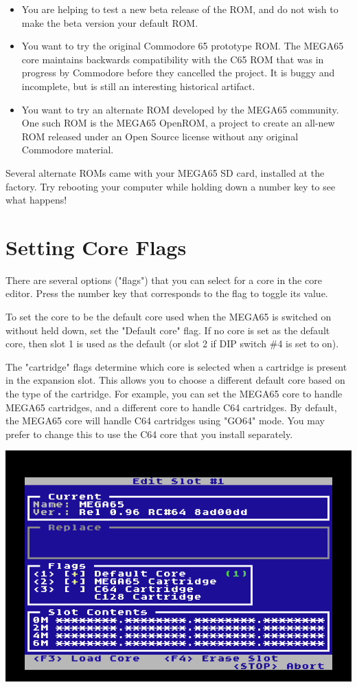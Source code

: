 \begin{itemize}
  \item You are helping to test a new beta release of the ROM, and do not wish to make the beta version your default ROM.
  \item You want to try the original Commodore 65 prototype ROM. The MEGA65 core maintains backwards compatibility with the C65 ROM that was in progress by Commodore before they cancelled the project. It is buggy and incomplete, but is still an interesting historical artifact.
  \item You want to try an alternate ROM developed by the MEGA65 community. One such ROM is the MEGA65 OpenROM, a project to create an all-new ROM released under an Open Source license without any original Commodore material.
\end{itemize}

Several alternate ROMs came with your MEGA65 SD card, installed at the factory. Try rebooting your computer while holding down a number key to see what happens!

\section{Setting Core Flags}

There are several options ("flags") that you can select for a core in the core editor. Press the number key that corresponds to the flag to toggle its value.

To set the core to be the default core used when the MEGA65 is switched on without  held down, set the "Default core" flag. If no core is set as the default core, then slot 1 is used as the default (or slot 2 if DIP switch \#4 is set to on).

The "cartridge" flags determine which core is selected when a cartridge is present in the expansion slot. This allows you to choose a different default core based on the type of the cartridge. For example, you can set the MEGA65 core to handle MEGA65 cartridges, and a different core to handle C64 cartridges. By default, the MEGA65 core will handle C64 cartridges using "GO64" mode. You may prefer to change this to use the C64 core that you install separately.

\begin{center}
  \includegraphics[width=0.7\linewidth]{images/ss-flashmenu-flags.png}
\end{center}

